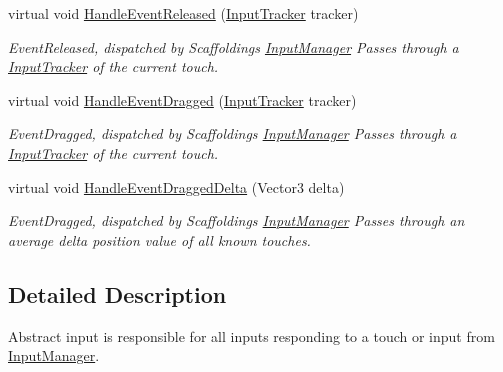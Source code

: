 \begin{DoxyCompactItemize}
virtual void \hyperlink{class_scaffolding_1_1_abstract_input_a11854454457cd55a26f345011f4bd6bc}{Handle\+Event\+Released} (\hyperlink{class_scaffolding_1_1_input_tracker}{Input\+Tracker} tracker)
\begin{DoxyCompactList}\small\item\em Event\+Released, dispatched by Scaffoldings \hyperlink{class_scaffolding_1_1_input_manager}{Input\+Manager} Passes through a \hyperlink{class_scaffolding_1_1_input_tracker}{Input\+Tracker} of the current touch. \end{DoxyCompactList}\item 
virtual void \hyperlink{class_scaffolding_1_1_abstract_input_a5996b0cb611a384e527ce871b9607858}{Handle\+Event\+Dragged} (\hyperlink{class_scaffolding_1_1_input_tracker}{Input\+Tracker} tracker)
\begin{DoxyCompactList}\small\item\em Event\+Dragged, dispatched by Scaffoldings \hyperlink{class_scaffolding_1_1_input_manager}{Input\+Manager} Passes through a \hyperlink{class_scaffolding_1_1_input_tracker}{Input\+Tracker} of the current touch. \end{DoxyCompactList}\item 
virtual void \hyperlink{class_scaffolding_1_1_abstract_input_a2f8eac0790f92d3ce70e196069cc6936}{Handle\+Event\+Dragged\+Delta} (Vector3 delta)
\begin{DoxyCompactList}\small\item\em Event\+Dragged, dispatched by Scaffoldings \hyperlink{class_scaffolding_1_1_input_manager}{Input\+Manager} Passes through an average delta position value of all known touches. \end{DoxyCompactList}\end{DoxyCompactItemize}


\subsection{Detailed Description}
Abstract input is responsible for all inputs responding to a touch or input from \hyperlink{class_scaffolding_1_1_input_manager}{Input\+Manager}. 



